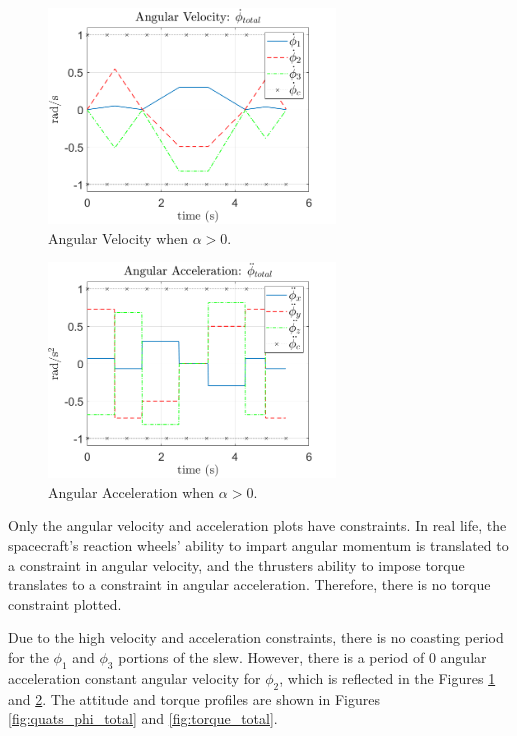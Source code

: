 \documentclass[letterpaper, preprint, paper,11pt]{AAS}	%
\begin{document}
	\begin{multicols}{2}
		\begin{figure}[H]
			\begin{center}
			\includegraphics[width=3in]{figures/alphaNot0/ang_vel_phi_total.png}
			\caption{Angular Velocity when $\alpha>0$.}
			\label{fig:ang_vel_phi_total}
			\end{center}
		\end{figure}
	\columnbreak
		\begin{figure}[H]
			\begin{center}
				\includegraphics[width=3in]{figures/alphaNot0/ang_accel_total.png}
				\caption{Angular Acceleration when $\alpha>0$.}
				\label{fig:ang_accel_total}
			\end{center}
		\end{figure}
	\end{multicols}

Only the angular velocity and acceleration plots have constraints. In real life, the spacecraft's reaction wheels' ability to impart angular momentum is translated to a constraint in angular velocity, and the thrusters ability to impose torque translates to a constraint in angular acceleration. Therefore, there is no torque constraint plotted. 

Due to the high velocity and acceleration constraints, there is no coasting period for the $\phi_1$ and $\phi_3$ portions of the slew. However, there is a period of 0 angular acceleration constant angular velocity for $\phi_2$, which is reflected in the Figures \ref{fig:ang_vel_phi_total} and \ref{fig:ang_accel_total}. The attitude and torque profiles are shown in Figures \ref{fig:quats_phi_total} and \ref{fig:torque_total}. 
	
\end{document}
